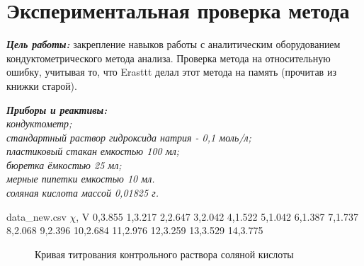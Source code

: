 \documentclass{article}
\begin{document}
    \section*{Экспериментальная проверка метода}
   \textbf{\textit{Цель работы:}} 
   закрепление навыков работы с аналитическим оборудованием кондуктометрического метода анализа. Проверка метода на относительную ошибку,
   учитывая то, что Erasttt делал этот метода на память (прочитав из книжки старой).
   \begin{flushleft}
    \textbf{\textit{Приборы и реактивы:}} \\
    \textit{кондуктометр;} \\
    \textit{стандартный раствор гидроксида натрия - 0,1 моль/л;} \\
    \textit{пластиковый стакан емкостью 100 мл;} \\
    \textit{бюретка ёмкостью 25 мл;} \\
    \textit{мерные пипетки емкостью 10 мл.} \\
    \textit{соляная кислота массой 0,01825 г.}
    \end{flushleft}
    
    \begin{filecontents*}{data_new.csv}
    $\chi$, V
    0,3.855
    1,3.217
    2,2.647
    3,2.042
    4,1.522
    5,1.042
    6,1.387
    7,1.737
    8,2.068
    9,2.396
    10,2.684
    11,2.976
    12,3.259
    13,3.529
    14,3.775
    \end{filecontents*}
    
    \begin{figure}[h]
        \centering
        \caption{Кривая титрования контрольного раствора соляной кислоты}
    \end{figure}
    
\end{document}
